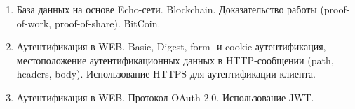 \begin{enumerate}
    \item База данных на основе Echo-сети. Blockchain. Доказательство работы (proof-of-work, proof-of-share). BitCoin.
    \item Аутентификация в WEB. Basic, Digest, form- и cookie-аутентификация, местоположение аутентификационных данных в HTTP-сообщении (path, headers, body). Использование HTTPS для аутентификации клиента.
    \item Аутентификация в WEB. Протокол OAuth 2.0. Использование JWT.

\end{enumerate}
